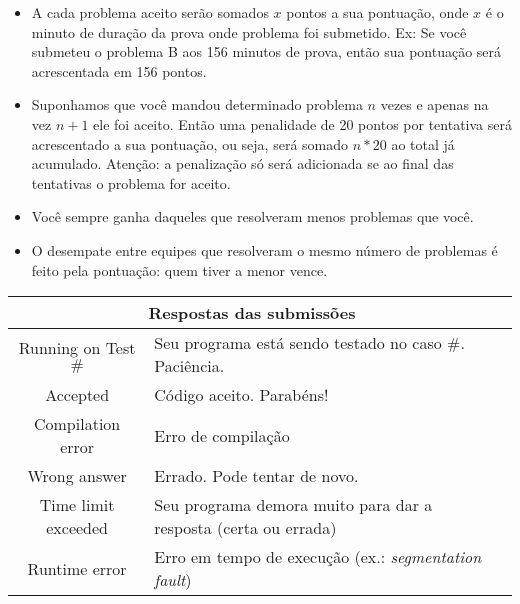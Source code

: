 \documentclass[a4paper,11pt]{article}
\newcommand{\PASTA}{.}
\newcommand{\incluir}[2]{
\renewcommand{\PASTA}{#1}

}
\begin{document}
\begin{itemize}
	\item A cada problema aceito serão somados $x$ pontos a sua pontuação, onde $x$ é 
	o minuto de duração da prova onde problema foi submetido. Ex: Se você submeteu o 
	problema B aos 156 minutos de prova, então sua pontuação será acrescentada em 156
	pontos.
	\item Suponhamos que você mandou determinado problema $n$ vezes e apenas na vez $n+1$
	ele foi aceito. Então uma penalidade de 20 pontos por tentativa será acrescentado a sua
	pontuação, ou seja, será somado $n*20$ ao total já acumulado. Atenção: a penalização só 
	será adicionada se ao final das tentativas o problema for aceito.
	\item Você sempre ganha daqueles que resolveram menos problemas que você.
	\item O desempate entre equipes que resolveram o mesmo número de problemas é feito 
	pela pontuação: quem tiver a menor vence.
\end{itemize}

\vspace*{1.0cm}

\renewcommand{\arraystretch}{1.5}
\begin{center}
	\begin{tabular}{|c|l|p{5.8cm}|}
		\hline
		\multicolumn{2}{|c|}{Respostas das submissões}\\
		\hline
		Running on Test $\#$ & Seu programa está sendo testado no caso $\#$. Paciência.\\
		\hline
		Accepted & Código aceito. Parabéns!\\
		\hline
		Compilation error & Erro de compilação\\
		\hline
		Wrong answer & Errado. Pode tentar de novo.\\
		\hline
		Time limit exceeded & 
		Seu programa demora muito para dar a resposta (certa ou errada)\\
		\hline
		Runtime error & 
		Erro em tempo de execução (ex.: \textit{segmentation fault})\\
		\hline
	\end{tabular}
\end{center}
\renewcommand{\arraystretch}{1.0}

\newpage

\setcounter{letra}{1}
\newcommand{\proxLetra}{\Alph{letra}\stepcounter{letra}}

\incluir{../problemas/ambulatorio/docs}{enunciado.tex} \clearpage
\incluir{../problemas/aula/docs}{enunciado.tex} \clearpage
\incluir{../problemas/cinema/docs}{enunciado.tex} \clearpage
\incluir{../problemas/circular/docs}{enunciado.tex} \clearpage
\incluir{../problemas/restaurante/docs}{enunciado.tex} \clearpage
\incluir{../problemas/karaoke/docs}{enunciado.tex} \clearpage
\incluir{../problemas/kart/docs}{enunciado.tex} \clearpage
\incluir{../problemas/nim/docs}{enunciado.tex} \clearpage
\incluir{../problemas/pablito/docs}{enunciado.tex} \clearpage
\incluir{../problemas/perdido/docs}{enunciado.tex} \clearpage
\incluir{../problemas/raia/docs}{enunciado.tex} \clearpage
\incluir{../problemas/xadrez/docs}{enunciado.tex} \clearpage
\incluir{../problemas/japones/docs}{enunciado.tex} \clearpage
\end{document}
